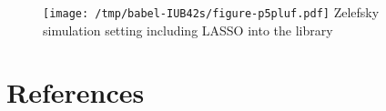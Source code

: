 \documentclass[a4paper,danish]{article}
\begin{document}
\begin{figure}[htbp]
\centering
\texttt{[image: /tmp/babel-IUB42s/figure-p5pluf.pdf]}
Zelefsky simulation setting including LASSO into the library
\end{figure}



\section{References}
\label{sec:org92fb677}
\renewcommand{\section}[2]{} 

\end{document}
